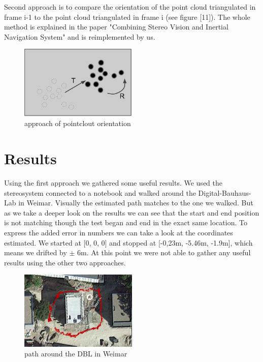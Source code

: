 \documentclass[11pt]{article}
\begin{document}
	Second approach is to compare the orientation of the point cloud triangulated in frame i-1 to the point cloud triangulated in frame i (see figure [11]).
	The whole method is explained in the paper "Combining Stereo Vision and Inertial Navigation System" \cite{cloudOrientation} and is reimplemented by us.

	\begin{figure}[H]
		\centering
		\includegraphics[width=0.5\textwidth]{images/pointcloud_orientation.png}
		\caption{approach of pointclout orientation}
	\end{figure}
	
	\section{Results}
	Using the first approach we gathered some useful results. We used the stereosystem connected to a notebook and walked around the Digital-Bauhaus-Lab in Weimar. Visually the estimated path matches to the one we walked. But as we take a deeper look on the results we can see that the start and end position is not matching though the test began and end in the exact same location. To express the added error in numbers we can take a look at the coordinates estimated. We started at [0, 0, 0] and stopped at [-0,23m, -5.46m, -1.9m], which means we drifted by $\pm$ 6m. At this point we were not able to gather any useful results using the other two approaches.
	
	\begin{figure}[H]
		\centering
		\includegraphics[width=0.5\textwidth]{images/result.jpg}
		\caption{path around the DBL in Weimar}
	\end{figure}
\end{document}
